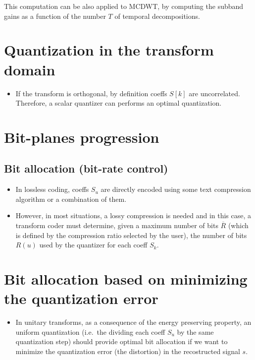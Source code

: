 This computation can be also applied to MCDWT, by computing the subband
gains as a function of the number $T$ of temporal decompositions.


\section{Quantization in the transform domain}
\begin{itemize}
\tightlist
\item
  If the transform is orthogonal, by definition coeffs \(S[k]\) are
  uncorrelated. Therefore, a scalar quantizer can performs an optimal
  quantization.
\end{itemize}

\section{Bit-planes progression}

\subsection{Bit allocation (bit-rate control)}
\begin{itemize}
\item
  In lossless coding, coeffs \(S_u\) are directly encoded using some
  text compression algorithm or a combination of them.
\item
  However, in most situations, a lossy compression is needed and in this
  case, a transform coder must determine, given a maximum number of bits
  \(\overline{R}\) (which is defined by the compression ratio selected
  by the user), the number of bits \(R(u)\) used by the quantizer for
  each coeff \(S_k\).
\end{itemize}

\section{Bit allocation based on minimizing the quantization error}
\begin{itemize}
\tightlist
\item
  In unitary transforms, as a consequence of the energy preserving
  property, an uniform quantization (i.e.~the dividing each coeff
  \(S_u\) by the same quantization step) should provide optimal bit
  allocation if we want to minimize the quantization error (the
  distortion) in the recostructed signal \(s\).
\end{itemize}

